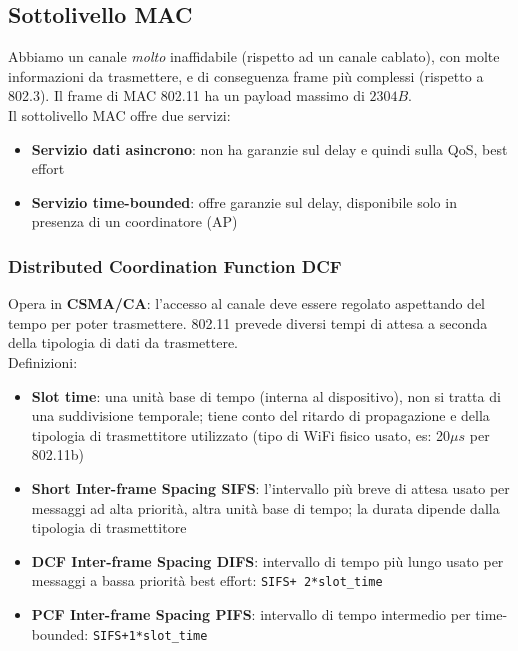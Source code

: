 \newpage

\subsection{Sottolivello MAC}

Abbiamo un canale \textit{molto} inaffidabile (rispetto ad un canale cablato), con molte informazioni da trasmettere, e di conseguenza frame più complessi (rispetto a 802.3). Il frame di MAC 802.11 ha un payload massimo di $2304B$.\\

Il sottolivello MAC offre due servizi: 
\begin{itemize}
	\item \textbf{Servizio dati asincrono}: non ha garanzie sul delay e quindi sulla QoS, best effort
	\item \textbf{Servizio time-bounded}: offre garanzie sul delay, disponibile solo in presenza di un coordinatore (AP)
\end{itemize}

\subsubsection{Distributed Coordination Function DCF}
Opera in \textbf{CSMA/CA}: l'accesso al canale deve essere regolato aspettando del tempo per poter trasmettere. 802.11 prevede diversi tempi di attesa a seconda della tipologia di dati da trasmettere.\\

Definizioni: 
\begin{itemize}
	\item \textbf{Slot time}: una unità base di tempo (interna al dispositivo), non si tratta di una suddivisione temporale; tiene conto del ritardo di propagazione e della tipologia di trasmettitore utilizzato (tipo di WiFi fisico usato, es: 20$\mu s$ per 802.11b)
	\item \textbf{Short Inter-frame Spacing SIFS}: l'intervallo più breve di attesa usato per messaggi ad alta priorità, altra unità base di tempo; la durata dipende dalla tipologia di trasmettitore
	\item \textbf{DCF Inter-frame Spacing DIFS}: intervallo di tempo più lungo usato per messaggi a bassa priorità best effort: \texttt{SIFS+ 2*slot\_time}
	\item \textbf{PCF Inter-frame Spacing PIFS}: intervallo di tempo intermedio per time-bounded: \texttt{SIFS+1*slot\_time}
\end{itemize}

